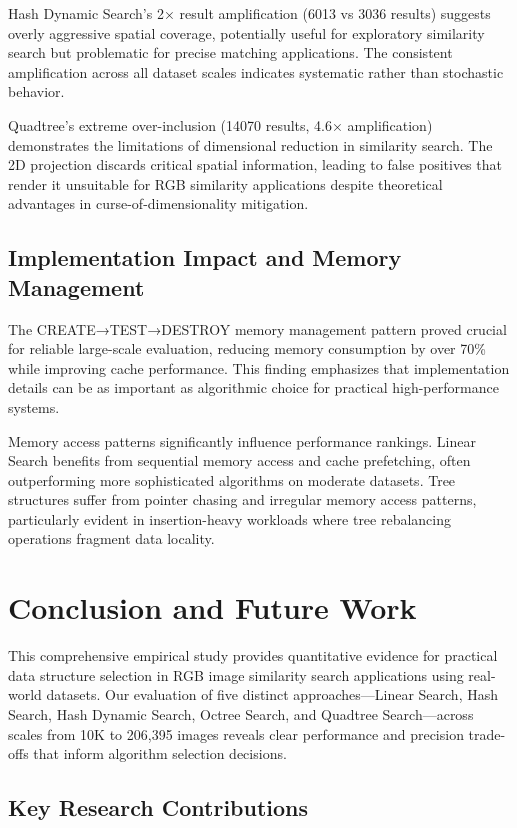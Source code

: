 \documentclass{sbc2023}
\begin{document}
Hash Dynamic Search's 2× result amplification (6013 vs 3036 results) suggests overly aggressive spatial coverage, potentially useful for exploratory similarity search but problematic for precise matching applications. The consistent amplification across all dataset scales indicates systematic rather than stochastic behavior.

Quadtree's extreme over-inclusion (14070 results, 4.6× amplification) demonstrates the limitations of dimensional reduction in similarity search. The 2D projection discards critical spatial information, leading to false positives that render it unsuitable for RGB similarity applications despite theoretical advantages in curse-of-dimensionality mitigation.

\subsection{Implementation Impact and Memory Management}

The CREATE→TEST→DESTROY memory management pattern proved crucial for reliable large-scale evaluation, reducing memory consumption by over 70\% while improving cache performance. This finding emphasizes that implementation details can be as important as algorithmic choice for practical high-performance systems.

Memory access patterns significantly influence performance rankings. Linear Search benefits from sequential memory access and cache prefetching, often outperforming more sophisticated algorithms on moderate datasets. Tree structures suffer from pointer chasing and irregular memory access patterns, particularly evident in insertion-heavy workloads where tree rebalancing operations fragment data locality.

\section{Conclusion and Future Work}
\label{sec:conclusion}

This comprehensive empirical study provides quantitative evidence for practical data structure selection in RGB image similarity search applications using real-world datasets. Our evaluation of five distinct approaches—Linear Search, Hash Search, Hash Dynamic Search, Octree Search, and Quadtree Search—across scales from 10K to 206,395 images reveals clear performance and precision trade-offs that inform algorithm selection decisions.

\subsection{Key Research Contributions}
\end{document}
